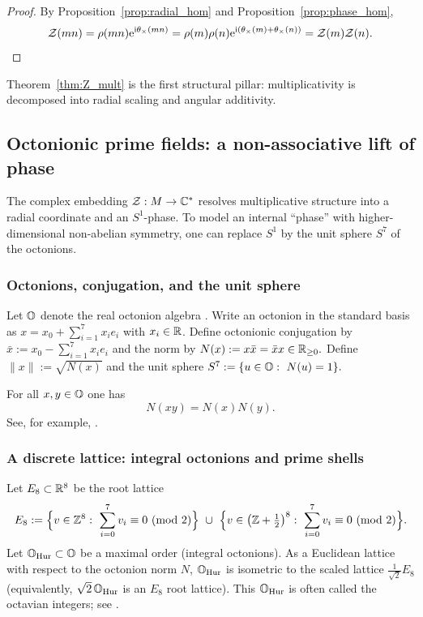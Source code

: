 \begin{proof}
By Proposition~\ref{prop:radial_hom} and Proposition~\ref{prop:phase_hom},
$$
\mathcal{Z}(mn)=\rho(mn)\mathrm{e}^{\mathrm{i}\theta_\times(mn)}=\rho(m)\rho(n)\mathrm{e}^{\mathrm{i}(\theta_\times(m)+\theta_\times(n))}=\mathcal{Z}(m)\mathcal{Z}(n).
$$
\end{proof}

Theorem~\ref{thm:Z_mult} is the first structural pillar: multiplicativity is decomposed into radial scaling and angular additivity.

\subsection{Octonionic prime fields: a non-associative lift of phase}
The complex embedding $\mathcal{Z}:M\to\mathbb{C}^*$ resolves multiplicative structure into a radial coordinate and an $S^1$-phase.
To model an internal ``phase'' with higher-dimensional non-abelian symmetry, one can replace $S^1$ by the unit sphere $S^7$ of the octonions.

\subsubsection{Octonions, conjugation, and the unit sphere}
\begin{definition}
\label{def:octonions}
Let $\mathbb{O}$ denote the real octonion algebra \cite{Baez2002}.
Write an octonion in the standard basis as
$
x=x_0+\sum_{i=1}^7 x_i e_i
$
with $x_i\in\mathbb{R}$.
Define octonionic conjugation by
$
\bar{x}:=x_0-\sum_{i=1}^7 x_i e_i
$
and the norm by
$
N(x):=x\bar{x}=\bar{x}x\in\mathbb{R}_{\ge 0}.
$
Define $\|x\|:=\sqrt{N(x)}$ and the unit sphere
$
S^7:=\{u\in\OO:\ N(u)=1\}.
$
\end{definition}

\begin{proposition}[Composition]
\label{prop:octonion_composition}
For all $x,y\in\mathbb{O}$ one has
$$
N(xy)=N(x)N(y).
$$
See, for example, \cite{Baez2002}.
\end{proposition}

\subsubsection{A discrete lattice: integral octonions and prime shells}
\begin{definition}
\label{def:ohur}
Let $E_8\subset\mathbb{R}^8$ be the root lattice
$$
E_8:=\Big\{v\in\ZZ^8:\ \sum_{i=0}^7 v_i\equiv 0\ (\mathrm{mod}\ 2)\Big\}\ \cup\
\Big\{v\in\big(\ZZ+\tfrac12\big)^8:\ \sum_{i=0}^7 v_i\equiv 0\ (\mathrm{mod}\ 2)\Big\}.
$$
Let $\mathbb{O}_{\mathrm{Hur}}\subset\mathbb{O}$ be a maximal order (integral octonions). As a Euclidean lattice with respect to the octonion norm $N$, $\mathbb{O}_{\mathrm{Hur}}$ is isometric to the scaled lattice $\frac{1}{\sqrt{2}}E_8$ (equivalently, $\sqrt{2}\,\mathbb{O}_{\mathrm{Hur}}$ is an $E_8$ root lattice). This $\mathbb{O}_{\mathrm{Hur}}$ is often called the octavian integers; see \cite{ConwaySmith2003}.
\end{definition}

